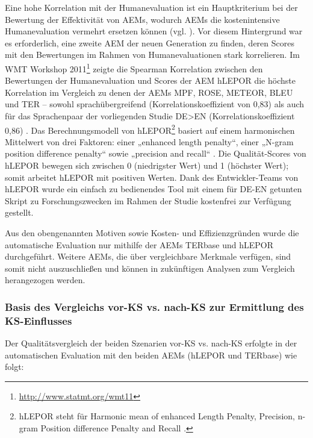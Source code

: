 Eine hohe Korrelation mit der Humanevaluation ist ein Hauptkriterium bei der Bewertung der Effektivität von AEMs, wodurch AEMs die kostenintensive Humanevaluation vermehrt ersetzen können (vgl. \citealt{LinOch2004}). Vor diesem Hintergrund war es erforderlich, eine zweite AEM der neuen Generation zu finden, deren Scores mit den Bewertungen im Rahmen von Humanevaluationen stark korrelieren. Im WMT Workshop 2011\footnote{\url{http://www.statmt.org/wmt11}} zeigte die Spearman Korrelation zwischen den Bewertungen der Humanevaluation und Scores der AEM hLEPOR die höchste Korrelation im Vergleich zu denen der AEMs MPF, ROSE, METEOR, BLEU und TER -- sowohl sprachübergreifend (Korrelationskoeffizient von 0,83) als auch für das Sprachenpaar der vorliegenden Studie DE>EN (Korrelationskoeffizient 0,86) \citep{HanEtAl2013}. Das Berechnungsmodell von hLEPOR\footnote{{hLEPOR steht für Harmonic mean of enhanced Length Penalty, Precision, n-gram Position difference Penalty and Recall \citep{HanEtAl2013}.}} basiert auf einem harmonischen Mittelwert von drei Faktoren: einer „enhanced length penalty“, einer „N-gram position difference penalty“ sowie „precision and recall“ \citep{HanEtAl2013}. Die Qualität-Scores von hLEPOR bewegen sich zwischen 0 (niedrigster Wert) und 1 (höchster Wert); somit arbeitet hLEPOR mit positiven Werten. Dank des Entwickler-Teams von hLEPOR wurde ein einfach zu bedienendes Tool mit einem für DE-EN getunten Skript zu Forschungszwecken im Rahmen der Studie kostenfrei zur Verfügung gestellt.

Aus den obengenannten Motiven sowie Kosten- und Effizienzgründen wurde die automatische Evaluation nur mithilfe der AEMs TERbase und hLEPOR durchgeführt. Weitere AEMs, die über vergleichbare Merkmale verfügen, sind somit nicht auszuschließen und können in zukünftigen Analysen zum Vergleich herangezogen werden.

\subsubsection{\label{sec:4.4.6.4}Basis des Vergleichs vor-KS vs. nach-KS zur Ermittlung des KS-Einflusses}

Der Qualitätsvergleich der beiden Szenarien vor-KS vs. nach-KS erfolgte in der automatischen Evaluation mit den beiden AEMs (hLEPOR und TERbase) wie folgt:


